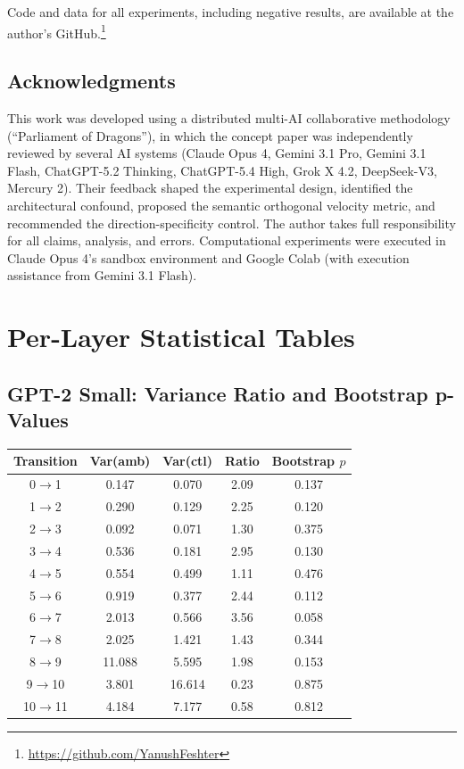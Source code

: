 \documentclass[11pt,a4paper]{article}
\begin{document}
Code and data for all experiments, including negative results, are available at the author's GitHub.\footnote{\url{https://github.com/YanushFeshter}}

\subsection*{Acknowledgments}
This work was developed using a distributed multi-AI collaborative methodology (``Parliament of Dragons''), in which the concept paper was independently reviewed by several AI systems (Claude Opus 4, Gemini 3.1 Pro, Gemini 3.1 Flash, ChatGPT-5.2 Thinking, ChatGPT-5.4 High, Grok X 4.2, DeepSeek-V3, Mercury 2). Their feedback shaped the experimental design, identified the architectural confound, proposed the semantic orthogonal velocity metric, and recommended the direction-specificity control. The author takes full responsibility for all claims, analysis, and errors. Computational experiments were executed in Claude Opus 4's sandbox environment and Google Colab (with execution assistance from Gemini 3.1 Flash).

\clearpage
\appendix
\section{Per-Layer Statistical Tables}
\label{app:tables}

\subsection{GPT-2 Small: Variance Ratio and Bootstrap p-Values}

\begin{center}
\small
\begin{tabular}{ccccc}
\toprule
Transition & Var(amb) & Var(ctl) & Ratio & Bootstrap $p$ \\
\midrule
0$\to$1  & 0.147 & 0.070 & 2.09 & 0.137 \\
1$\to$2  & 0.290 & 0.129 & 2.25 & 0.120 \\
2$\to$3  & 0.092 & 0.071 & 1.30 & 0.375 \\
3$\to$4  & 0.536 & 0.181 & 2.95 & 0.130 \\
4$\to$5  & 0.554 & 0.499 & 1.11 & 0.476 \\
5$\to$6  & 0.919 & 0.377 & 2.44 & 0.112 \\
6$\to$7  & 2.013 & 0.566 & 3.56 & 0.058 \\
7$\to$8  & 2.025 & 1.421 & 1.43 & 0.344 \\
8$\to$9  & 11.088 & 5.595 & 1.98 & 0.153 \\
9$\to$10 & 3.801 & 16.614 & 0.23 & 0.875 \\
10$\to$11 & 4.184 & 7.177 & 0.58 & 0.812 \\
\bottomrule
\end{tabular}
\end{center}
\end{document}
